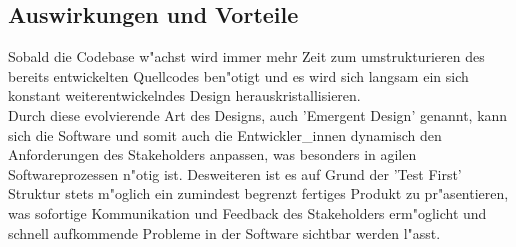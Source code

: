 \documentclass[runningheads,a4paper]{llncs}
\begin{document}
  \subsection{Auswirkungen und Vorteile}
    Sobald die Codebase w"achst wird immer mehr Zeit zum umstrukturieren des 
    bereits entwickelten Quellcodes ben"otigt und es wird sich langsam ein 
    sich konstant weiterentwickelndes Design herauskristallisieren.\\
    Durch diese evolvierende Art des Designs, auch 'Emergent Design'\cite[p.~4]{Chelimsky:2010} genannt, kann sich die Software und somit auch die 
    Entwickler\_innen dynamisch den Anforderungen des Stakeholders anpassen, was 
    besonders in agilen Softwareprozessen n"otig ist. Desweiteren ist es auf 
    Grund der 'Test First' Struktur stets m"oglich ein zumindest begrenzt 
    fertiges Produkt zu pr"asentieren, was sofortige Kommunikation und Feedback
    des Stakeholders erm"oglicht und schnell aufkommende Probleme in der Software
    sichtbar werden l"asst.\\
\end{document}
